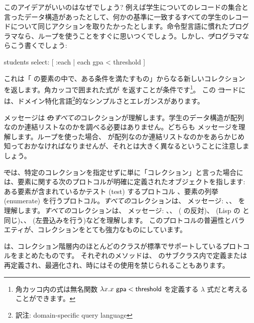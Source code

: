 \documentclass[a4paper,10pt,twoside]{book}
\begin{document}
このアイデアがいいのはなぜでしょう?
例えば学生についてのレコードの集合と言ったデータ構造があったとして、何かの基準に一致するすべての学生のレコードについて同じアクションを取りたかったとします。命令型言語に慣れたプログラマなら、ループを使うことをすぐに思いつくでしょう。しかし、\st プログラマならこう書くでしょう:
\begin{code}{}
students select: [ :each | each gpa < threshold ]
\end{code}
\noindent
これは「 の要素の中で、ある条件を満たすもの」からなる新しいコレクションを返します。角カッコで囲まれた式が  を返すことが条件です\footnote{角カッコ内の式は無名関数 $\lambda x. x~{\sf gpa} < {\sf threshold}$ を定義する $\lambda$ 式だと考えることができます。%
}。
この \st コードには、ドメイン特化言語\footnote{訳注: domain-specific query language}的なシンプルさとエレガンスがあります。

 メッセージは \st の\emph{すべての}コレクションが理解します。学生のデータ構造が配列なのか連結リストなのかを調べる必要はありません。どちらも  メッセージを理解します。ループを使った場合、 が配列なのか連結リストなのかをあらかじめ知っておかなければなりませんが、それとは大きく異なるということに注意しましょう。%

\st では、特定のコレクションを指定せずに単に「コレクション」と言った場合には、要素に関する次のプロトコルが明確に定義されたオブジェクトを指します: ある要素が含まれているかテスト (test) するプロトコル 、要素の列挙 (enumerate) を行うプロトコル。\emph{すべての}コレクションは、 メッセージ: \mbox{、}\mbox{、} を理解します。\emph{すべての}コレクションは、 メッセージ: 、、 ( の反対)、 (Lisp の と同じ)、、 (左畳込みを行う)などを理解します。
このプロトコルの普遍性とバラエティが、コレクションをとても強力なものにしています。

 は、コレクション階層内のほとんどのクラスが標準でサポートしているプロトコルをまとめたものです。
それぞれのメソッドは、 のサブクラス内で定義または再定義され、最適化され、時にはその使用を禁じられることもあります。
\end{document}
